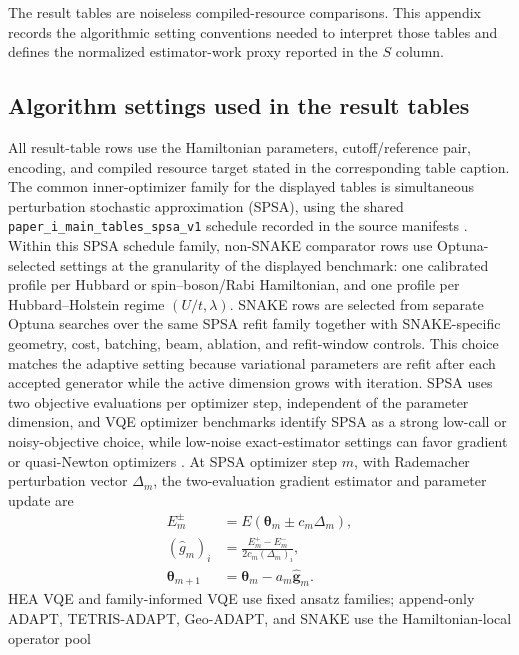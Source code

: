 \documentclass[
  reprint,
  amsmath,
  amssymb,
  aps,
  pra,
  nofootinbib,
  superscriptaddress,
  floatfix
]{revtex4-2}
\begin{document}
The result tables are noiseless compiled-resource comparisons. This appendix
records the algorithmic setting conventions needed to interpret those tables and
defines the normalized estimator-work proxy reported in the \(S\) column.

\subsection{Algorithm settings used in the result tables}

All result-table rows use the Hamiltonian parameters, cutoff/reference pair,
encoding, and compiled resource target stated in the corresponding table
caption. The common inner-optimizer family for the displayed tables is simultaneous
perturbation stochastic approximation (SPSA), using the shared
\texttt{paper\_i\_main\_tables\_spsa\_v1} schedule recorded in the source
manifests \cite{Spall1992SPSA,Kandala2017}. Within this SPSA schedule family,
non-SNAKE comparator rows use Optuna-selected settings at the granularity of the
displayed benchmark: one calibrated profile per Hubbard or spin--boson/Rabi
Hamiltonian, and one profile per Hubbard--Holstein regime \((U/t,\lambda)\).
SNAKE rows are selected from separate Optuna searches over the same SPSA refit
family together with SNAKE-specific geometry, cost, batching, beam, ablation,
and refit-window controls. This choice matches the adaptive
setting because variational parameters are refit after each accepted generator
while the active dimension grows with iteration. SPSA uses two objective
evaluations per optimizer step, independent of the parameter dimension, and VQE
optimizer benchmarks identify SPSA as a strong low-call or noisy-objective
choice, while low-noise exact-estimator settings can favor gradient or
quasi-Newton optimizers
\cite{BonetMonroig2023Optimizer,Singh2023Optimizers,Jones2025FermiHubbardOptimizers}.
At SPSA optimizer step \(m\), with
Rademacher perturbation vector \(\Delta_m\), the two-evaluation gradient
estimator and parameter update are
\begin{align}
E_m^\pm&=E(\boldsymbol{\theta}_m\pm c_m\Delta_m), \nonumber\\
(\widehat g_m)_i&=\frac{E_m^+-E_m^-}{2c_m(\Delta_m)_i}, \nonumber\\
\boldsymbol{\theta}_{m+1}&=\boldsymbol{\theta}_m-a_m\widehat{\mathbf g}_m .
\label{eq:spsa_inner_optimizer}
\end{align}
HEA VQE and family-informed VQE use fixed ansatz families; append-only ADAPT,
TETRIS-ADAPT, Geo-ADAPT, and SNAKE use the Hamiltonian-local operator pool
\end{document}
